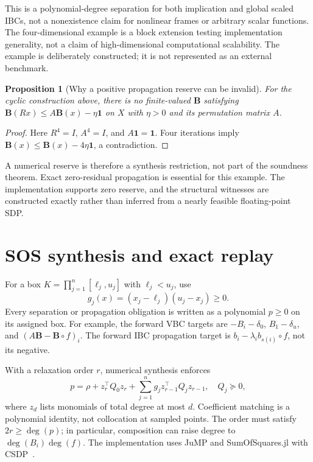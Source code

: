 \documentclass[5p,times]{elsarticle}
\newtheorem{proposition}[theorem]{Proposition}
\theoremstyle{definition}\newtheorem{definition}[theorem]{Definition}
\theoremstyle{remark}\newtheorem{remark}[theorem]{Remark}
\newcommand{\one}{\mathbf 1}\newcommand{\B}{\mathbf B}
\begin{document}
This is a polynomial-degree separation for both implication and global scaled IBCs, not a nonexistence claim for nonlinear frames or arbitrary scalar functions. The four-dimensional example is a block extension testing implementation generality, not a claim of high-dimensional computational scalability. The example is deliberately constructed; it is not represented as an external benchmark.

\begin{proposition}[Why a positive propagation reserve can be invalid]\label{prop:reserve}
For the cyclic construction above, there is no finite-valued $\B$ satisfying $\B(Rx)\le A\B(x)-\eta\one$ on $X$ with $\eta>0$ and its permutation matrix $A$.
\end{proposition}
\begin{proof}
Here $R^4=I$, $A^4=I$, and $A\one=\one$. Four iterations imply $\B(x)\le\B(x)-4\eta\one$, a contradiction.
\end{proof}
A numerical reserve is therefore a synthesis restriction, not part of the soundness theorem. Exact zero-residual propagation is essential for this example. The implementation supports zero reserve, and the structural witnesses are constructed exactly rather than inferred from a nearly feasible floating-point SDP.

\section{SOS synthesis and exact replay}
For a box $K=\prod_{j=1}^n[\ell_j,u_j]$ with $\ell_j<u_j$, use
\[
 g_j(x)=(x_j-\ell_j)(u_j-x_j)\ge0.
\]
Every separation or propagation obligation is written as a polynomial $p\ge0$ on its assigned box. For example, the forward VBC targets are $-B_i-\delta_0$, $B_1-\delta_u$, and $(A\B-\B\circ f)_i$. The forward IBC propagation target is $b_i-\lambda_i b_{s(i)}\circ f$, not its negative.

With a relaxation order $r$, numerical synthesis enforces
\begin{equation}\label{eq:sos}
 p=\rho+z_r^\top Q_0z_r+
 \sum_{j=1}^n g_j z_{r-1}^\top Q_jz_{r-1},\quad Q_j\succeq0,
\end{equation}
where $z_d$ lists monomials of total degree at most $d$. Coefficient matching is a polynomial identity, not collocation at sampled points. The order must satisfy $2r\ge\deg(p)$; in particular, composition can raise degree to $\deg(B_i)\deg(f)$. The implementation uses JuMP and SumOfSquares.jl with CSDP~\cite{sos,csdp}.
\end{document}
